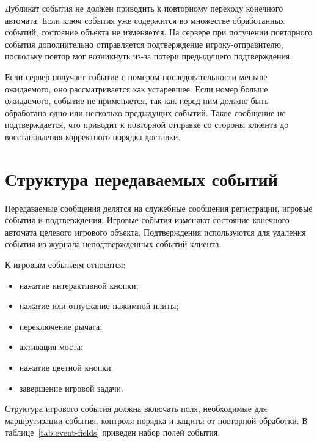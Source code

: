 Дубликат события не должен приводить к повторному переходу конечного автомата. Если ключ события уже содержится во множестве обработанных событий, состояние объекта не изменяется. На сервере при получении повторного события дополнительно отправляется подтверждение игроку-отправителю, поскольку повтор мог возникнуть из-за потери предыдущего подтверждения.

Если сервер получает событие с номером последовательности меньше ожидаемого, оно рассматривается как устаревшее. Если номер больше ожидаемого, событие не применяется, так как перед ним должно быть обработано одно или несколько предыдущих событий. Такое сообщение не подтверждается, что приводит к повторной отправке со стороны клиента до восстановления корректного порядка доставки.

\section{Структура передаваемых событий}

Передаваемые сообщения делятся на служебные сообщения регистрации, игровые события и подтверждения. Игровые события изменяют состояние конечного автомата целевого игрового объекта. Подтверждения используются для удаления события из журнала неподтвержденных событий клиента.

К игровым событиям относятся:
\begin{itemize}
	\item нажатие интерактивной кнопки;
	\item нажатие или отпускание нажимной плиты;
	\item переключение рычага;
	\item активация моста;
	\item нажатие цветной кнопки;
	\item завершение игровой задачи.
\end{itemize}

Структура игрового события должна включать поля, необходимые для маршрутизации события, контроля порядка и защиты от повторной обработки. В таблице~\ref{tab:event-fields} приведен набор полей события.

